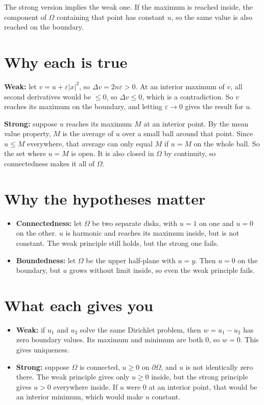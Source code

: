 \documentclass[11pt]{article}
\newcommand{\lap}{\Delta}
\begin{document}
The strong version implies the weak one. If the maximum is reached inside, the
component of $\Omega$ containing that point has constant $u$, so the same value
is also reached on the boundary.

\section*{Why each is true}

\textbf{Weak:} let $v = u + \varepsilon|x|^2$, so $\lap v = 2n\varepsilon > 0$.
At an interior maximum of $v$, all second derivatives would be $\le 0$, so
$\lap v \le 0$, which is a contradiction. So $v$ reaches its maximum on the
boundary, and letting $\varepsilon \to 0$ gives the result for $u$.

\textbf{Strong:} suppose $u$ reaches its maximum $M$ at an interior point. By
the mean value property, $M$ is the average of $u$ over a small ball around
that point. Since $u \le M$ everywhere, that average can only equal $M$ if
$u = M$ on the whole ball. So the set where $u = M$ is open. It is also closed
in $\Omega$ by continuity, so connectedness makes it all of $\Omega$.

\section*{Why the hypotheses matter}

\begin{itemize}
\item \textbf{Connectedness:} let $\Omega$ be two separate disks, with $u = 1$
  on one and $u = 0$ on the other. $u$ is harmonic and reaches its maximum
  inside, but is not constant. The weak principle still holds, but the strong
  one fails.
\item \textbf{Boundedness:} let $\Omega$ be the upper half-plane with $u = y$.
  Then $u = 0$ on the boundary, but $u$ grows without limit inside, so even the
  weak principle fails.
\end{itemize}

\section*{What each gives you}

\begin{itemize}
\item \textbf{Weak:} if $u_1$ and $u_2$ solve the same Dirichlet problem, then
  $w = u_1 - u_2$ has zero boundary values. Its maximum and minimum are both 0,
  so $w = 0$. This gives uniqueness.
\item \textbf{Strong:} suppose $\Omega$ is connected, $u \ge 0$ on
  $\partial\Omega$, and $u$ is not identically zero there. The weak principle
  gives only $u \ge 0$ inside, but the strong principle gives $u > 0$
  everywhere inside. If $u$ were 0 at an interior point, that would be an
  interior minimum, which would make $u$ constant.
\end{itemize}
\end{document}

